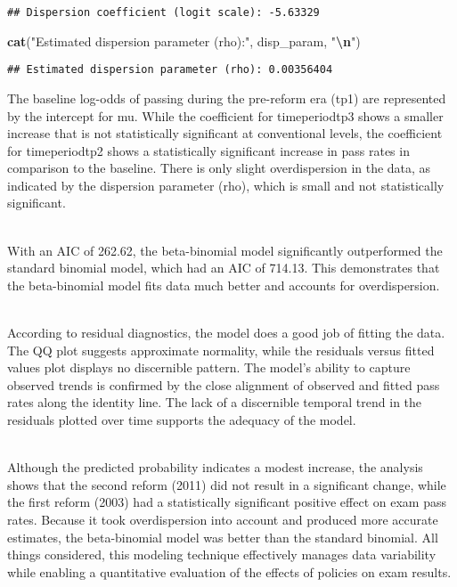 \documentclass[
]{article}
\newenvironment{Shaded}{\begin{snugshade}}{\end{snugshade}}
\newcommand{\FunctionTok}[1]{\textcolor[rgb]{0.13,0.29,0.53}{\textbf{#1}}}
\newcommand{\NormalTok}[1]{#1}
\newcommand{\SpecialCharTok}[1]{\textcolor[rgb]{0.81,0.36,0.00}{\textbf{#1}}}
\newcommand{\StringTok}[1]{\textcolor[rgb]{0.31,0.60,0.02}{#1}}
\begin{document}
\begin{verbatim}
## Dispersion coefficient (logit scale): -5.63329
\end{verbatim}

\begin{Shaded}
\begin{Highlighting}[]
\FunctionTok{cat}\NormalTok{(}\StringTok{"Estimated dispersion parameter (rho):"}\NormalTok{, disp\_param, }\StringTok{"}\SpecialCharTok{\textbackslash{}n}\StringTok{"}\NormalTok{)}
\end{Highlighting}
\end{Shaded}

\begin{verbatim}
## Estimated dispersion parameter (rho): 0.00356404
\end{verbatim}

The baseline log-odds of passing during the pre-reform era (tp1) are
represented by the intercept for mu. While the coefficient for
timeperiodtp3 shows a smaller increase that is not statistically
significant at conventional levels, the coefficient for timeperiodtp2
shows a statistically significant increase in pass rates in comparison
to the baseline. There is only slight overdispersion in the data, as
indicated by the dispersion parameter (rho), which is small and not
statistically significant.\\
\strut \\
With an AIC of 262.62, the beta-binomial model significantly
outperformed the standard binomial model, which had an AIC of 714.13.
This demonstrates that the beta-binomial model fits data much better and
accounts for overdispersion.\\
\strut \\
According to residual diagnostics, the model does a good job of fitting
the data. The QQ plot suggests approximate normality, while the
residuals versus fitted values plot displays no discernible pattern. The
model's ability to capture observed trends is confirmed by the close
alignment of observed and fitted pass rates along the identity line. The
lack of a discernible temporal trend in the residuals plotted over time
supports the adequacy of the model.\\
\strut \\
Although the predicted probability indicates a modest increase, the
analysis shows that the second reform (2011) did not result in a
significant change, while the first reform (2003) had a statistically
significant positive effect on exam pass rates. Because it took
overdispersion into account and produced more accurate estimates, the
beta-binomial model was better than the standard binomial. All things
considered, this modeling technique effectively manages data variability
while enabling a quantitative evaluation of the effects of policies on
exam results.
\end{document}
